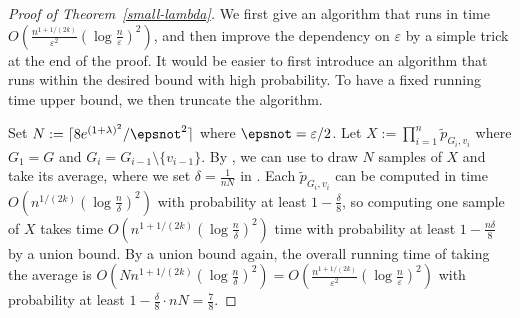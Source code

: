 \documentclass[10pt,a4paper]{article}
\newcommand{\eps}{\varepsilon}
\newcommand{\defeq}{:=}
\begin{document}
\begin{proof}[Proof of Theorem~\ref{small-lambda}]
  We first give an algorithm that runs in time $O\left(\frac{n^{1+1/(2k)}}{\eps^2}(\log \frac{n}{\eps})^2\right)$, 
  and then improve the dependency on $\eps$ by a simple trick at the end of the proof.
  It would be easier to first introduce an algorithm that runs within the desired bound with high probability.
  To have a fixed running time upper bound, we then truncate the algorithm.

  Set $N\defeq\lceil 8e^{(1+\lambda)^2}/\epsnot^2 \rceil$ where $\epsnot=\eps/2$.
  Let $X\defeq\prod_{i=1}^n \widetilde{p}_{G_i,v_i}$ where $G_1=G$ and $G_i=G_{i-1}\setminus\{v_{i-1}\}$.
  By , we can use  to draw $N$ samples of $X$ and take its average, where we set $\delta=\frac{1}{nN}$ in  .
  Each $\widetilde{p}_{G_i,v_i}$ can be computed in time $O(n^{1/(2k)}(\log \frac{n}{\delta})^2)$ with probability at least $1-\frac{\delta}{8}$, 
  so computing one sample of $X$ takes time $O(n^{1+1/(2k)}(\log \frac{n}{\delta})^2)$ time with probability at least $1-\frac{n\delta}{8}$ by a union bound. 
  By a union bound again, the overall running time of taking the average is $O(Nn^{1+1/(2k)}(\log \frac{n}{\delta})^2)=O\left(\frac{n^{1+1/(2k)}}{\eps^2}(\log \frac{n}{\eps})^2\right)$ 
  with probability at least $1-\frac{\delta}{8}\cdot nN = \frac{7}{8}$.
  


\end{proof}
\end{document}
